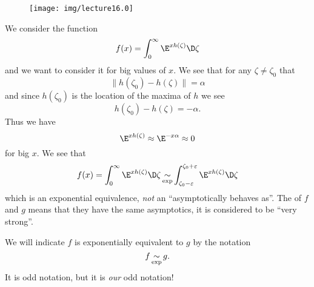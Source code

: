 \begin{wrapfigure}[14]{l}{1.85in}
\vspace{-24pt}
\begin{center}
\texttt{[image: img/lecture16.0]}
\end{center}
\end{wrapfigure}
\noindent{}We consider the function
\begin{equation}
f(x)=\int^{\infty}_{0}\E^{x h(\zeta)}\D\zeta
\end{equation}
and we want to consider it for big values of $x$. We see that for
any $\zeta\not=\zeta_{0}$ that
\begin{equation}
\|h(\zeta_{0})-h(\zeta)\|=\alpha
\end{equation}
and since $h(\zeta_{0})$ is the location of the maxima of $h$ we
see
\begin{equation}
h(\zeta_{0})-h(\zeta)=-\alpha.
\end{equation}
Thus we have
\begin{equation}
\E^{xh(\zeta)}\approx\E^{-x\alpha}\approx0
\end{equation}
for big $x$. We see that
\begin{equation}
f(x)=\int^{\infty}_{0}\E^{xh(\zeta)}\D\zeta\expequiv\int^{\zeta_{0}+\varepsilon}_{\zeta_{0}-\varepsilon}\E^{xh(\zeta)}\D\zeta
\end{equation}
which is an exponential equivalence, \emph{not} an
``asymptotically behaves as''. The  of $f$ and $g$ means that they have the same
asymptotics, it is considered to be ``very strong''.

\begin{notation}
We will indicate $f$ is exponentially equivalent to $g$ by the
notation
\begin{equation}
f\mathop{\sim}_{\text{exp}} g.
\end{equation}
It is odd notation, but it is \emph{our} odd notation!
\end{notation}


